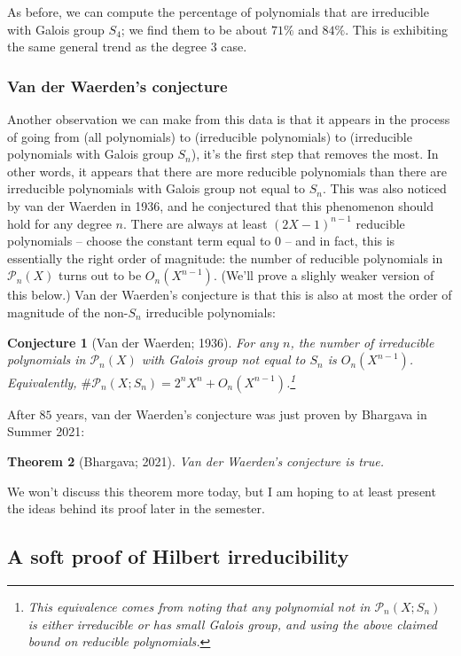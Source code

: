 \documentclass[12pt]{amsart}
\newtheorem{theorem}{Theorem}
\newtheorem{conjecture}[theorem]{Conjecture}
\theoremstyle{definition} \newtheorem*{notation}{Notation}
\theoremstyle{remark} \newtheorem*{remark}{Remark}
\theoremstyle{remark} \newtheorem*{example}{Example}
\theoremstyle{definition} \newtheorem*{definition}{Definition}
\numberwithin{equation}{section}
\numberwithin{theorem}{section}
\begin{document}
	As before, we can compute the percentage of polynomials that are irreducible with Galois group $S_4$; we find them to be about $71\%$ and $84\%$.  This is exhibiting the same general trend as the degree $3$ case.
	
	\subsubsection{Van der Waerden's conjecture}
	Another observation we can make from this data is that it appears in the process of going from (all polynomials) to (irreducible polynomials) to (irreducible polynomials with Galois group $S_n$), it's the first step that removes the most.  In other words, it appears that there are more reducible polynomials than there are irreducible polynomials with Galois group not equal to $S_n$.  This was also noticed by van der Waerden in 1936, and he conjectured that this phenomenon should hold for any degree $n$.  There are always at least $(2X-1)^{n-1}$ reducible polynomials -- choose the constant term equal to $0$ -- and in fact, this is essentially the right order of magnitude: the number of reducible polynomials in $\mathcal{P}_n(X)$ turns out to be $O_n(X^{n-1})$.  (We'll prove a slighly weaker version of this below.)  Van der Waerden's conjecture is that this is also at most the order of magnitude of the non-$S_n$ irreducible polynomials:
	
	\begin{conjecture}[Van der Waerden; 1936]
		For any $n$, the number of irreducible polynomials in $\mathcal{P}_n(X)$ with Galois group not equal to $S_n$ is $O_n(X^{n-1})$.  Equivalently, $\#\mathcal{P}_n(X;S_n) = 2^n X^n + O_n(X^{n-1})$.\footnote{This equivalence comes from noting that any polynomial not in $\mathcal{P}_n(X;S_n)$ is either irreducible or has small Galois group, and using the above claimed bound on reducible polynomials.}
	\end{conjecture}
	
	After $85$ years, van der Waerden's conjecture was just proven by Bhargava in Summer 2021:
	
	\begin{theorem}[Bhargava; 2021]
		Van der Waerden's conjecture is true.
	\end{theorem}
	
	We won't discuss this theorem more today, but I am hoping to at least present the ideas behind its proof later in the semester.

	\subsection{A soft proof of Hilbert irreducibility}
	
\end{document}
